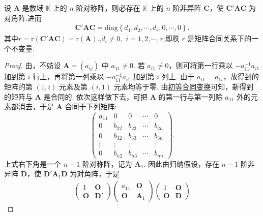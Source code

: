 \documentclass[../../main.tex]{subfiles}
\begin{document}
\begin{theorem}[对称矩阵的合同标准型]\label{theorem:对称矩阵的合同标准型}
设 $\boldsymbol{A}$ 是数域 $\mathbb{K}$ 上的 $n$ 阶对称阵，则必存在 $\mathbb{K}$ 上的 $n$ 阶非异阵 $\boldsymbol{C}$，使 $\boldsymbol{C}'\boldsymbol{A}\boldsymbol{C}$ 为对角阵.进而
\begin{align*}
\boldsymbol{C}' \boldsymbol{AC}=\mathrm{diag}\left\{ d_1,d_2,\cdots ,d_r,0,\cdots ,0 \right\} .
\end{align*}
其中$r=\mathrm{r}\left( \boldsymbol{C}' \boldsymbol{AC} \right)=\mathrm{r}\left( \boldsymbol{A} \right) .$,$d_i\ne 0,$ $i=1,2,\cdots,r.$即秩 $r$ 是矩阵合同关系下的一个不变量.
\end{theorem}
\begin{proof}
由，不妨设 $\boldsymbol{A}=(a_{ij})$ 中 $a_{11}\neq 0$. 若 $a_{i1}\neq 0$，则可将第一行乘以 $-a_{11}^{-1}a_{i1}$ 加到第 $i$ 行上，再将第一列乘以 $-a_{11}^{-1}a_{i1}$ 加到第 $i$ 列上. 由于 $a_{i1}=a_{1i}$，故得到的矩阵的第 $(1,i)$ 元素及第 $(i,1)$ 元素均等于零. 由\hyperref[lemma:初等合同变换]{初等合同变换}可知，新得到的矩阵与 $\boldsymbol{A}$ 是合同的. 依次这样做下去，可把 $\boldsymbol{A}$ 的第一行与第一列除 $a_{11}$ 外的元素都消去，于是 $\boldsymbol{A}$ 合同于下列矩阵:
\[
\begin{pmatrix}
a_{11} & 0 & 0 & \cdots & 0 \\
0 & b_{22} & b_{23} & \cdots & b_{2n} \\
0 & b_{32} & b_{33} & \cdots & b_{3n} \\
\vdots & \vdots & \vdots & & \vdots \\
0 & b_{n2} & b_{n3} & \cdots & b_{nn}
\end{pmatrix}.
\]
上式右下角是一个 $n - 1$ 阶对称阵，记为 $\boldsymbol{A}_1$. 因此由归纳假设，存在 $n - 1$ 阶非异阵 $\boldsymbol{D}$，使 $\boldsymbol{D}'\boldsymbol{A}_1\boldsymbol{D}$ 为对角阵，于是
\begin{align*}
\begin{pmatrix}
1 & \boldsymbol{O} \\
\boldsymbol{O} & \boldsymbol{D}'
\end{pmatrix}
\begin{pmatrix}
a_{11} & \boldsymbol{O} \\
\boldsymbol{O} & \boldsymbol{A}_1
\end{pmatrix}
\begin{pmatrix}
1 & \boldsymbol{O} \\
\boldsymbol{O} & \boldsymbol{D}
\end{pmatrix}

\end{align*}
\end{proof}
\end{document}
